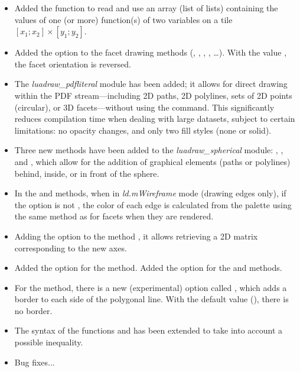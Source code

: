 \begin{itemize}

    \item Added the function  to read and use an array (list of lists) containing the values ​​of one (or more) function(s) of two variables on a tile $[x_1;x_2]\times [y_1;y_2]$.

    \item Added the option  to the facet drawing methods (, , , , \ldots). With the value \true, the facet orientation is reversed.
    
    \item The \emph{luadraw\_pdfliteral} module has been added; it allows for direct drawing within the PDF stream—including 2D paths, 2D polylines, sets of 2D points (circular), or 3D facets—without using the \drawcmd command. This significantly reduces compilation time when dealing with large datasets, subject to certain limitations: no opacity changes, and only two fill styles (none or solid).
    
    \item Three new methods have been added to the \emph{luadraw\_spherical} module: , , and , which allow for the addition of graphical elements (paths or polylines) behind, inside, or in front of the sphere.

    \item In the  and  methods, when in \emph{ld.mWireframe} mode (drawing edges only), if the  option is not \nil, the color of each edge is calculated from the palette using the same method as for facets when they are rendered.
    
    \item Adding the option  to the method , it allows retrieving a 2D matrix corresponding to the new axes.
    
    \item Added the  option for the  method. Added the  option for the  and  methods.
    
    \item For the  method, there is a new (experimental) option called , which adds a border to each side of the polygonal line. With the default value (\nil), there is no border.

    \item The syntax of the functions  and  has been extended to take into account a possible inequality.
    
    \item Bug fixes...
\end{itemize}


